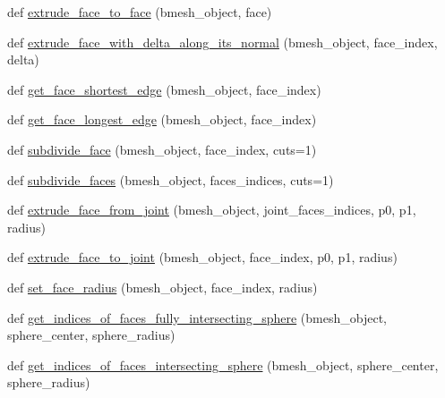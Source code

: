 \begin{DoxyCompactItemize}
\item 
def \hyperlink{namespacemeshy_1_1neuromorphovis_1_1bmeshi_1_1ops_1_1bmesh__face__ops_a81001a7a289bd82deacb164bb224f839}{extrude\+\_\+face\+\_\+to\+\_\+face} (bmesh\+\_\+object, face)
\item 
def \hyperlink{namespacemeshy_1_1neuromorphovis_1_1bmeshi_1_1ops_1_1bmesh__face__ops_a9e87f56169d59bb56252b27950443c2b}{extrude\+\_\+face\+\_\+with\+\_\+delta\+\_\+along\+\_\+its\+\_\+normal} (bmesh\+\_\+object, face\+\_\+index, delta)
\item 
def \hyperlink{namespacemeshy_1_1neuromorphovis_1_1bmeshi_1_1ops_1_1bmesh__face__ops_a499cadc3b74509cb10e15187db3e34c3}{get\+\_\+face\+\_\+shortest\+\_\+edge} (bmesh\+\_\+object, face\+\_\+index)
\item 
def \hyperlink{namespacemeshy_1_1neuromorphovis_1_1bmeshi_1_1ops_1_1bmesh__face__ops_a29648cd3998bf7c085ae909b07757b33}{get\+\_\+face\+\_\+longest\+\_\+edge} (bmesh\+\_\+object, face\+\_\+index)
\item 
def \hyperlink{namespacemeshy_1_1neuromorphovis_1_1bmeshi_1_1ops_1_1bmesh__face__ops_ac2e3caebf2775f92b3f8606326a29907}{subdivide\+\_\+face} (bmesh\+\_\+object, face\+\_\+index, cuts=1)
\item 
def \hyperlink{namespacemeshy_1_1neuromorphovis_1_1bmeshi_1_1ops_1_1bmesh__face__ops_af8b05c806d7feb8a8bf5d1d23d46b4f0}{subdivide\+\_\+faces} (bmesh\+\_\+object, faces\+\_\+indices, cuts=1)
\item 
def \hyperlink{namespacemeshy_1_1neuromorphovis_1_1bmeshi_1_1ops_1_1bmesh__face__ops_aceadfd46022c3325eaf0d8dde43b6559}{extrude\+\_\+face\+\_\+from\+\_\+joint} (bmesh\+\_\+object, joint\+\_\+faces\+\_\+indices, p0, p1, radius)
\item 
def \hyperlink{namespacemeshy_1_1neuromorphovis_1_1bmeshi_1_1ops_1_1bmesh__face__ops_aa71ae8f44a29630bf177caae8ef2e316}{extrude\+\_\+face\+\_\+to\+\_\+joint} (bmesh\+\_\+object, face\+\_\+index, p0, p1, radius)
\item 
def \hyperlink{namespacemeshy_1_1neuromorphovis_1_1bmeshi_1_1ops_1_1bmesh__face__ops_ab140693b77302aacedd249e7b17c91dc}{set\+\_\+face\+\_\+radius} (bmesh\+\_\+object, face\+\_\+index, radius)
\item 
def \hyperlink{namespacemeshy_1_1neuromorphovis_1_1bmeshi_1_1ops_1_1bmesh__face__ops_a4e4cac19e4763aa41253bd3c17ceb13a}{get\+\_\+indices\+\_\+of\+\_\+faces\+\_\+fully\+\_\+intersecting\+\_\+sphere} (bmesh\+\_\+object, sphere\+\_\+center, sphere\+\_\+radius)
\item 
def \hyperlink{namespacemeshy_1_1neuromorphovis_1_1bmeshi_1_1ops_1_1bmesh__face__ops_a6d24ebc56fd5ca723ff7b186ba5f2f35}{get\+\_\+indices\+\_\+of\+\_\+faces\+\_\+intersecting\+\_\+sphere} (bmesh\+\_\+object, sphere\+\_\+center, sphere\+\_\+radius)

\end{DoxyCompactItemize}
